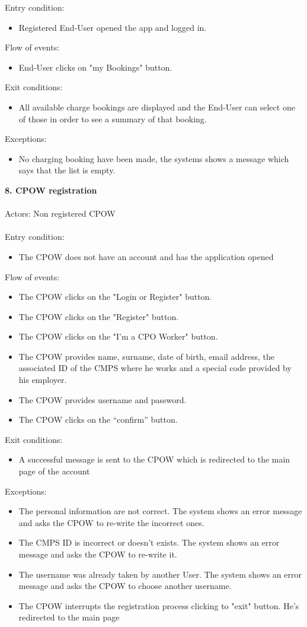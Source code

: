 \documentclass[a4paper]{report}
\begin{document}
Entry condition: 
\begin{itemize}
\item Registered End-User opened the app and logged in.
\end{itemize}
Flow of events:
\begin{itemize}
\item End-User clicks on "my Bookings" button.
\end{itemize}
Exit conditions: 
\begin{itemize}
\item All available charge bookings are displayed and the End-User can select one of those in order to see a summary of that booking.
\end{itemize} 
Exceptions: 
\begin{itemize}
\item No charging booking have been made, the systems shows a message which says that the list is empty.
\end{itemize}
\textbf{8. CPOW registration}\label{uc:1}
\\
\\
Actors: Non registered CPOW\\ \\
Entry condition: 
\begin{itemize}
\item The CPOW does not have an account and has the application opened
\end{itemize}
Flow of events:
\begin{itemize}
\item The CPOW clicks on the "Login or Register" button.
\item The CPOW clicks on the "Register" button.
\item The CPOW clicks on the "I'm a CPO Worker" button.
\item The CPOW provides name, surname, date of birth, email address, the associated ID of the CMPS where he works and a special code provided by his employer.
\item The CPOW provides username and password. 
\item The CPOW clicks on the “confirm” button.
\end{itemize}
Exit conditions: 
\begin{itemize}
\item A successful message is sent to the CPOW which is redirected to the main page of the account 
\end{itemize}
Exceptions: 
\begin{itemize}
\item The personal information are not correct. The system shows an error message and asks the CPOW to re-write the incorrect ones.
\item The CMPS ID is incorrect or doesn't exists. The system shows an error message and asks the CPOW to re-write it.
\item The username was already taken by another User. The system shows an error message and asks the CPOW to choose another username.
\item The CPOW interrupts the registration process clicking to "exit" button. He's redirected to the main page
\end{itemize}
\end{document}
